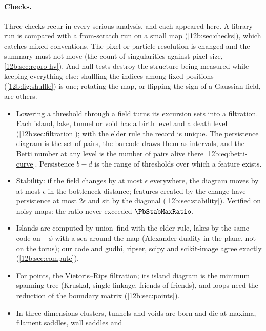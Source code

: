 \paragraph{Checks.} Three checks recur in every serious analysis, and each appeared here. A library run is compared
with a from-scratch run on a small map (\cref{12b:sec:checks}), which catches mixed conventions. The pixel or particle
resolution is changed and the summary must not move (the count of singularities against pixel size,
\cref{12b:sec:repro-hv}). And null tests destroy the structure being measured while keeping everything else: shuffling
the indices among fixed positions (\cref{12b:fig:shuffle}) is one; rotating the map, or flipping the sign of a Gaussian
field, are others.

\begin{recap}
\begin{itemize}[itemsep=1pt,leftmargin=1.2em]
  \item Lowering a threshold through a field turns its excursion sets into a filtration. Each island, lake, tunnel or
        void has a birth level and a death level (\cref{12b:sec:filtration}); with the elder rule the record is unique.
        The persistence diagram is the set of pairs, the barcode draws them as intervals, and the Betti number at any
        level is the number of pairs alive there \eqref{12b:eq:betti-curve}. Persistence $b-d$ is the range of thresholds
        over which a feature exists.
  \item Stability: if the field changes by at most $\epsilon$ everywhere, the diagram moves by at most $\epsilon$ in the
        bottleneck distance; features created by the change have persistence at most $2\epsilon$ and sit by the diagonal
        (\cref{12b:sec:stability}). Verified on noisy maps: the ratio never exceeded $\PbStabMaxRatio$.
  \item Islands are computed by union--find with the elder rule, lakes by the same code on $-\phi$ with a sea around the
        map (Alexander duality in the plane, not on the torus); our code and gudhi, ripser, scipy and scikit-image agree
        exactly (\cref{12b:sec:compute}).
  \item For points, the Vietoris--Rips filtration; its island diagram is the minimum spanning tree (Kruskal, single
        linkage, friends-of-friends), and loops need the reduction of the boundary matrix (\cref{12b:sec:points}).
  \item In three dimensions clusters, tunnels and voids are born and die at maxima, filament saddles, wall saddles and

\end{itemize}
\end{recap}
